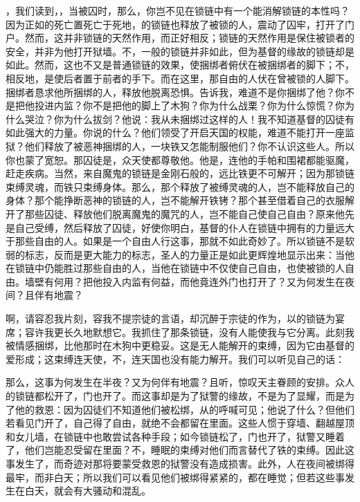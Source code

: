 ，我们读到，，当被囚时，那么，你岂不见在锁链中有一个能消解锁链的本性吗？因为正如的死亡置死亡于死地，的锁链也释放了被锁的人，震动了囚牢，打开了门户。然而，这并非锁链的天然作用，而正好相反；锁链的天然作用是保住被锁者的安全，并非为他打开狱墙。不，一般的锁链并非如此，但为基督的缘故的锁链却是如此。然而，这也不又是普通锁链的效果，使捆绑者俯伏在被捆绑者的脚下；不，相反地，是使后者置于前者的手下。而在这里，那自由的人伏在曾被锁的人脚下。捆绑者恳求他所捆绑的人，释放他脱离恐惧。告诉我，难道不是你捆绑了他？你不是把他投进内监？你不是把他的脚上了木狗？你为什么战栗？你为什么惊慌？你为什么哭泣？你为什么拔剑？他说：我从未捆绑过这样的人！我不知道基督的囚徒有如此强大的力量。你说的什么？他们领受了开启天国的权能，难道不能打开一座监狱？他们释放了被恶神捆绑的人，一块铁又怎能制服他们？你不认识这些人。所以你也蒙了宽恕。那囚徒是，众天使都尊敬他。他是，连他的手帕和围裙都能驱魔，赶走疾病。当然，来自魔鬼的锁链是金刚石般的，远比铁更不可解开；因为那锁链束缚灵魂，而铁只束缚身体。那么，那个释放了被缚灵魂的人，岂不能释放自己的身体？那个能挣断恶神的锁链的人，岂不能解开铁铐？那个甚至借着自己的衣服解开了那些囚徒、释放他们脱离魔鬼的魔咒的人，岂不能自己使自己自由？原来他先是自己受缚，然后释放了囚徒，好使你明白，基督的仆人在锁链中拥有的力量远大于那些自由的人。如果是一个自由人行这事，那就不如此奇妙了。所以锁链不是软弱的标志，反而是更大能力的标志，圣人的力量正是如此更辉煌地显示出来：当他在锁链中仍能胜过那些自由的人，当他在锁链中不仅使自己自由，也使被锁的人自由。墙壁有何用？把他投入内监有何益，而他竟连外门也打开了？又为何发生在夜间？且伴有地震？\par

啊，请容忍我片刻，容我不提宗徒的言语，却沉醉于宗徒的作为，以的锁链为宴席；容许我更长久地默想它。我抓住了那条锁链，没有人能使我与它分离。此刻我被情感捆绑，比他那时在木狗中更稳妥。这是无人能解开的束缚，因为它由基督的爱形成；这束缚连天使，不，连天国也没有能力解开。我们可以听见自己的话：\par

那么，这事为何发生在半夜？又为何伴有地震？且听，惊叹天主眷顾的安排。众人的锁链都松开了，门也开了。而这事却是为了狱警的缘故，不是为了显耀，而是为了他的救恩：因为囚徒们不知道他们被松绑，从的呼喊可见；他说了什么？但他们若看见门开了，自己得了自由，就绝不会都留在里面。这些人惯于穿墙、翻越屋顶和女儿墙，在锁链中也敢尝试各种手段；如今锁链松了，门也开了，狱警又睡着了，他们岂能忍受留在里面？不，睡眠的束缚对他们而言替代了铁的束缚。因此这事发生了，而奇迹对那将要蒙受救恩的狱警没有造成损害。此外，人在夜间被绑得最牢，而非白天；所以我们可以看见他们被绑得紧紧的，都在睡觉；但若这些事发生在白天，就会有大骚动和混乱。\par

